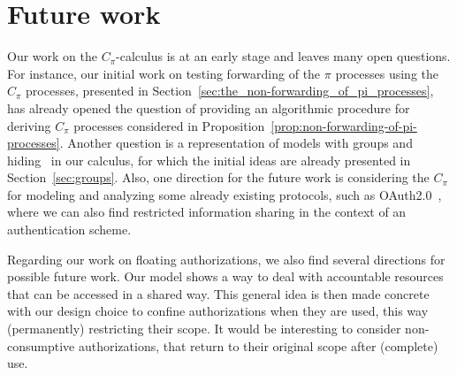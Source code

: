 

%









\section{Future work }

Our work on the $C_\pi$-calculus is at an early stage and leaves many open questions. 
For instance, our initial work on testing forwarding of the $\pi$ processes using the $C_\pi$ processes, presented in Section~\ref{sec:the_non-forwarding_of_pi_processes}, has already opened the question of providing an algorithmic procedure for deriving $C_\pi$ processes considered in Proposition~\ref{prop:non-forwarding-of-pi-processes}.
Another question is a representation of models with groups and hiding~\cite{cardelli05, Giunti} in our calculus, for which the initial ideas are already presented in Section~\ref{sec:groups}. 
Also, one direction for the future work is considering the $C_\pi$ for modeling and analyzing some already existing protocols, such as OAuth2.0~\cite{oauth}, where we can also find restricted information sharing in the context of an authentication scheme.

Regarding our work on floating authorizations, we also find several directions for possible future work. 
Our model shows a way to deal with accountable resources that can be accessed in a shared way. This general idea is then made concrete with our design choice to confine authorizations when they are used, this way (permanently) restricting their scope. 
It would be interesting to consider non-consumptive authorizations, that return to their
original scope after (complete) use. 


